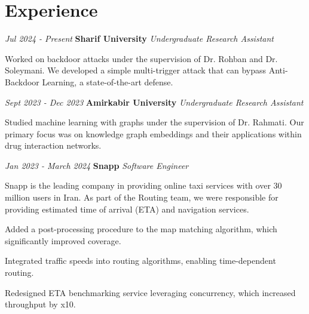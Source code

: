 \section{Experience}


\begin{twocolentry}
	{\textit{Jul 2024 - Present}}
	\textbf{Sharif University}
	\textit{Undergraduate Research Assistant}
\end{twocolentry}

\begin{onecolentry}
	Worked on backdoor attacks under the supervision of Dr. Rohban and Dr. Soleymani. We developed a simple multi-trigger attack that can bypass Anti-Backdoor Learning, a state-of-the-art defense. 
\end{onecolentry}

\vspace{0.20cm}

\begin{twocolentry}
	{\textit{Sept 2023 - Dec 2023}}
	\textbf{Amirkabir University}
	\textit{Undergraduate Research Assistant}
\end{twocolentry}


\begin{onecolentry}
	Studied machine learning with graphs under the supervision of Dr. Rahmati. Our primary focus was on knowledge graph embeddings and their applications within drug interaction networks. 
\end{onecolentry}

\vspace{0.20cm}

\begin{twocolentry}
	{\textit{Jan 2023 - March 2024}}
	\textbf{Snapp}
	\textit{Software Engineer}
\end{twocolentry}


\begin{onecolentry}
	Snapp is the leading company in providing online taxi services with over 30 million users in Iran. As part of the Routing team, we were responsible for providing estimated time of arrival (ETA) and navigation services. 
	
	\begin{highlights}
		\item Added a post-processing procedure to the map matching algorithm, which significantly improved coverage.
		\item Integrated traffic speeds into routing algorithms, enabling time-dependent routing. 
		\item Redesigned ETA benchmarking service leveraging concurrency, which increased  throughput by x10.
		
	\end{highlights}
	
\end{onecolentry}

